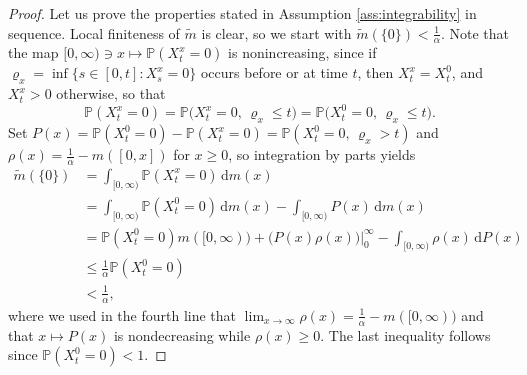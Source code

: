 \documentclass[11pt, a4paper]{article}
\theoremstyle{plain}
\theoremstyle{definition}
\theoremstyle{remark}
\numberwithin{equation}{section}
\newcommand{\pr}{\mathbb{P}}
\renewcommand{\d}{\mathrm{d}}
\newcommand{\define}{\mathpunct{:}}
\begin{document}
\begin{proof}
Let us prove the properties stated in Assumption \ref{ass:integrability} in sequence. Local finiteness of $\tilde{m}$ is clear, so we start with $\tilde{m}(\{0\}) < \frac{1}{\alpha}$. Note that the map $[0, \infty) \ni x \mapsto \pr(X^x_t = 0)$ is nonincreasing, since if $\varrho_x = \inf\{s \in [0, t] \define X^x_s = 0\}$ occurs before or at time $t$, then $X^x_t = X^0_t$, and $X^x_t > 0$ otherwise, so that
\begin{equation*}
    \pr(X^x_t = 0) = \pr\bigl(X^x_t = 0,\, \varrho_x \leq t\bigr) = \pr\bigl(X^0_t = 0,\, \varrho_x \leq t\bigr).
\end{equation*}
Set $P(x) = \pr(X^0_t = 0) - \pr(X^x_t = 0) = \pr(X^0_t = 0,\, \varrho_x > t)$ and $\rho(x) = \frac{1}{\alpha} - m([0, x])$ for $x \geq 0$, so integration by parts yields
\begin{align*}
    \tilde{m}(\{0\}) &= \int_{[0, \infty)} \pr(X^x_t = 0) \, \d m(x) \\
    &= \int_{[0, \infty)} \pr(X^0_t = 0) \, \d m(x) - \int_{[0, \infty)} P(x) \, \d m(x) \\
    &= \pr(X^0_t = 0) m([0, \infty)) + \bigl(P(x) \rho(x) \bigr)\big\vert_0^{\infty} - \int_{[0, \infty)} \rho(x) \, \d P(x) \\
    &\leq \frac{1}{\alpha} \pr(X^0_t = 0) \\
    &< \frac{1}{\alpha},
\end{align*}
where we used in the fourth line that $\lim_{x \to \infty} \rho(x) = \frac{1}{\alpha} - m([0, \infty))$ and that $x \mapsto P(x)$ is nondecreasing while $\rho(x) \geq 0$. The last inequality follows since $\pr(X^0_t = 0) < 1$.


\end{proof}
\end{document}

